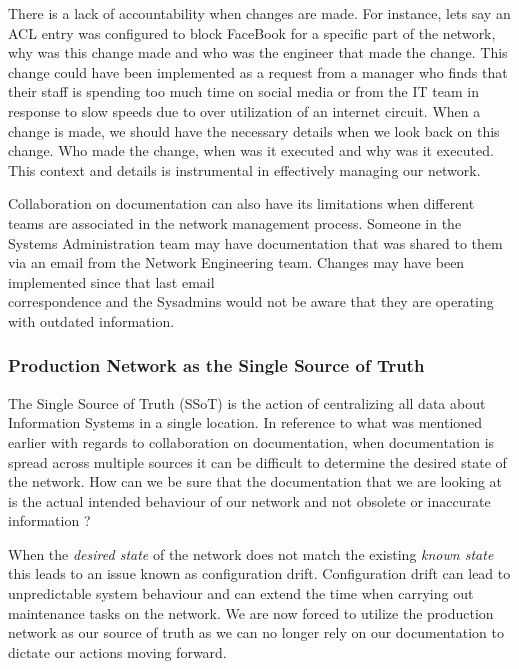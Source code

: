 \documentclass[12pt, letterpaper]{article}
\begin{document}
\smallskip

There is a lack of accountability when changes are made. For instance, lets say an ACL entry was configured to block FaceBook for a specific part of the network, why was this change made and who was the engineer that made the change. This change could have been implemented as a request from a manager who finds that their staff is spending too much time on social media or from the IT team in response to slow speeds due to over utilization of an internet circuit.
When a change is made, we should have the necessary details when we look back on this change. Who made the change, when was it executed and why was it executed. This context and details is instrumental in effectively managing our network.

\smallskip

Collaboration on documentation can also have its limitations when different teams are associated in the network management process. Someone in the Systems Administration team may have documentation that was shared to them via an email from the Network Engineering team. Changes may have been implemented since that last email \\ correspondence and the Sysadmins would not be aware that they are operating with outdated information.  


	\subsubsection{Production Network as the Single Source of Truth}
The Single Source of Truth (SSoT) is the action of centralizing all data about Information Systems in a single location. In reference to what was mentioned earlier with regards to collaboration on documentation, when documentation is spread across multiple sources it can be difficult to determine the desired state of the network. How can we be sure that the documentation that we are looking at is the actual intended behaviour of our network and not obsolete or inaccurate information ?

\smallskip

When the \textit{desired state} of the network does not match the existing \textit{known state} this leads to an issue known as configuration drift. Configuration drift can lead to unpredictable system behaviour and can extend the time when carrying out maintenance tasks on the network. We are now forced to utilize the production network as our source of truth as we can no longer rely on our documentation to dictate our actions moving forward. 
\end{document}
